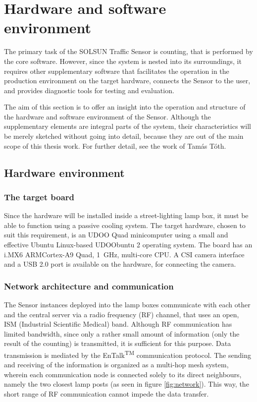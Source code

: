 \chapter{Hardware and software environment}\label{chap:Environment}
The primary task of the SOLSUN Traffic Sensor is counting, that is performed by the core software.
However, since the system is nested into its surroundings, it requires other supplementary software that facilitates the operation in the production environment on the target hardware, connects the Sensor to the user, and provides diagnostic tools for testing and evaluation.

The aim of this section is to offer an insight into the operation and structure of the hardware and software environment of the Sensor.
Although the supplementary elements are integral parts of the system, their characteristics will be merely sketched without going into detail, because they are out of the main scope of this thesis work.
For further detail, see the work of Tam{\'a}s T{\'o}th\cite{Toth2016}.
\section{Hardware environment}
\subsection{The target board}
Since the hardware will be installed inside a street-lighting lamp box, it must be able to function using a passive cooling system.
The target hardware, chosen to suit this requirement, is an UDOO Quad minicomputer using a small and effective Ubuntu Linux-based UDOObuntu 2 operating system.
The board has an i.MX6 ARM\reg Cortex\reg-A9 Quad, \SI{1}{GHz}, multi-core CPU\cite{UDOO, UDOO2}.
A CSI camera interface and a USB 2.0 port is available on the hardware, for connecting the camera.

\subsection{Network architecture and communication}
The Sensor instances deployed into the lamp boxes communicate with each other and the central server via a radio frequency (RF) channel, that uses an open, ISM (Industrial Scientific Medical) band.
Although RF communication has limited bandwidth, since only a rather small amount of information (only the result of the counting) is transmitted, it is sufficient for this purpose.
Data transmission is mediated by the EnTalk\textsuperscript{TM} communication protocol\cite{EnTalk}.
The sending and receiving of the information is organized as a multi-hop mesh system, wherein each communication node is connected solely to its direct neighbours, namely the two closest lamp posts (as seen in figure \ref{fig:network}).
This way, the short range of RF communication cannot impede the data transfer.

